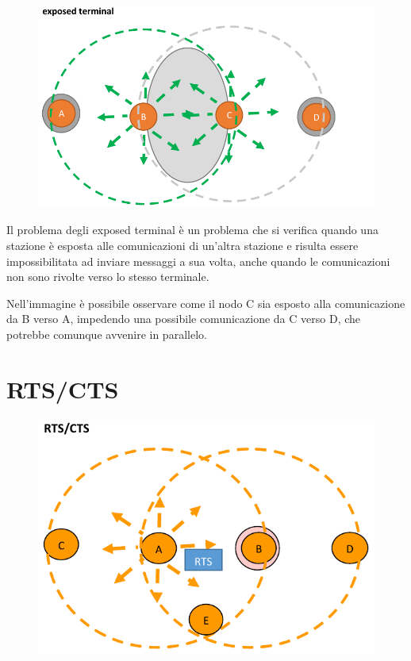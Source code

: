 \begin{figure}[htbp]
   \centering
   \includegraphics{images/questions/Schermata del 2023-11-01 15-26-25.png}
   \label{fig:dom2.2}
\end{figure}

Il problema degli exposed terminal è un problema che si verifica quando una stazione è esposta alle comunicazioni di un'altra stazione e risulta essere impossibilitata ad inviare messaggi a sua volta, anche quando le comunicazioni non sono rivolte verso lo stesso terminale.

Nell'immagine è possibile osservare come il nodo C sia esposto alla comunicazione da B verso A, impedendo una possibile comunicazione da C verso D, che potrebbe comunque avvenire in parallelo.

\section{RTS/CTS}

\begin{figure}[htbp]
   \centering
   \includegraphics{images/questions/Schermata del 2023-11-01 15-42-48.png}
   \label{fig:dom2.3}
\end{figure}

